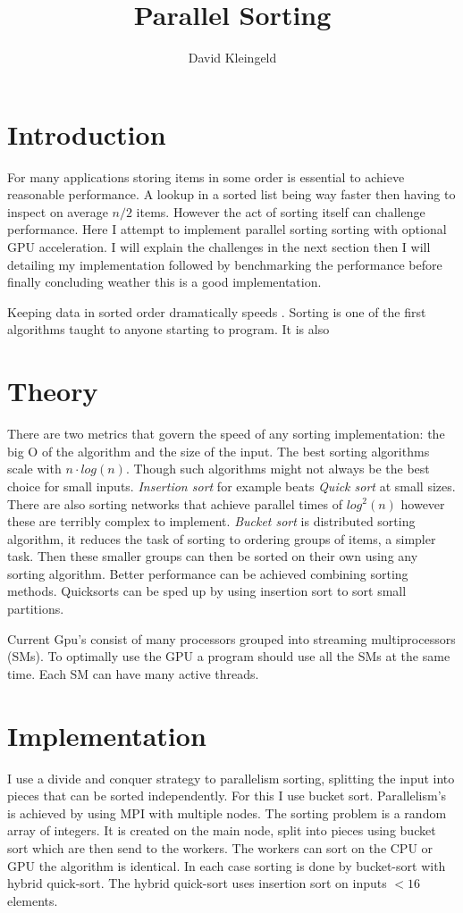 \documentclass[lang=en, hanging-titles=true]{skrapport}
\title{Parallel Sorting}
\author{David Kleingeld}
\begin{document}
\maketitle

\section{Introduction}
For many applications storing items in some order is essential to achieve reasonable performance. A lookup in a sorted list being way faster then having to inspect on average $n/2$ items. However the act of sorting itself can challenge performance. Here I attempt to implement parallel sorting sorting with optional GPU acceleration. I will explain the challenges in the next section then I will detailing my implementation followed by benchmarking the performance before finally concluding weather this is a good implementation.

Keeping data in sorted order dramatically speeds .
Sorting is one of the first algorithms taught to anyone starting to program. It is also 
\section{Theory}
There are two metrics that govern the speed of any sorting implementation: the big O of the algorithm and the size of the input. The best sorting algorithms scale with $n\cdot log(n)$. Though such algorithms might not always be the best choice for small inputs. \textit{Insertion sort} for example beats \textit{Quick sort} at small sizes. There are also sorting networks that achieve parallel times of $log^2(n)$ however these are terribly complex to implement. 
\textit{Bucket sort} is distributed sorting algorithm, it reduces the task of sorting to ordering groups of items, a simpler task. Then these smaller groups can then be sorted on their own using any sorting algorithm.
Better performance can be achieved combining sorting methods. Quicksorts can be sped up by using insertion sort to sort small partitions. 

Current Gpu's consist of many processors grouped into streaming multiprocessors (SMs). To optimally use the GPU a program should use all the SMs at the same time. Each SM can have many active threads.

\section{Implementation}
I use a divide and conquer strategy to parallelism sorting, splitting the input into pieces that can be sorted independently. For this I use bucket sort. Parallelism's is achieved by using MPI with multiple nodes. The sorting problem is a random array of integers. It is created on the main node, split into pieces using bucket sort which are then send to the workers. The workers can sort on the CPU or GPU the algorithm is identical. In each case sorting is done by bucket-sort with hybrid quick-sort. The hybrid quick-sort uses insertion sort on inputs $< 16$ elements. 
\end{document}
